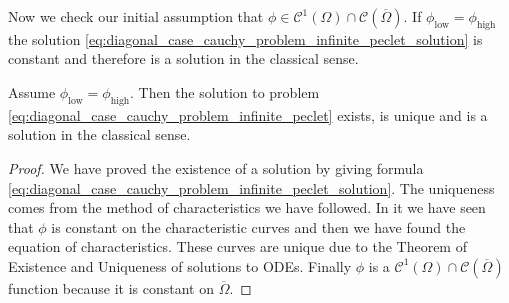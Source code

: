 Now we check our initial assumption that $\phi \in \mathcal{C}^1(\Omega) \cap \mathcal{C}(\overline{\Omega})$. If $\phi_\text{low} = \phi_\text{high}$ the solution \eqref{eq:diagonal_case_cauchy_problem_infinite_peclet_solution} is constant and therefore is a solution in the classical sense.

\begin{theorem}
	Assume $\phi_\text{low} = \phi_\text{high}$. Then the solution to problem \eqref{eq:diagonal_case_cauchy_problem_infinite_peclet} exists, is unique and is a solution in the classical sense.
\end{theorem}
\begin{proof}
	We have proved the existence of a solution by giving formula \eqref{eq:diagonal_case_cauchy_problem_infinite_peclet_solution}. The uniqueness comes from the method of characteristics we have followed. In it we have seen that $\phi$ is constant on the characteristic curves and then we have found the equation of characteristics. These curves are unique due to the Theorem of Existence and Uniqueness of solutions to ODEs. Finally $\phi$ is a $\mathcal{C}^1(\Omega) \cap \mathcal{C}(\overline{\Omega})$ function because it is constant on $\overline{\Omega}$.
\end{proof}

